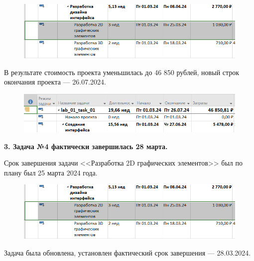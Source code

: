 \begin{figure}[h!]
	\begin{center}
		\includegraphics[scale=0.5]{inc/img/p_10.png}
	\end{center}
	\captionsetup{justification=centering}
	\label{fig:u3}
\end{figure}

В результате стоимость проекта уменьшилась до 46 850 рублей, новый строк окончания проекта --- 26.07.2024. 

\begin{figure}[h!]
	\begin{center}
		\includegraphics[scale=0.5]{inc/img/p_9.png}
	\end{center}
	\captionsetup{justification=centering}
	\label{fig:u3}
\end{figure}

\textbf{3. Задача №4 фактически завершилась 28 марта.}

Срок завершения задачи <<Разработка 2D графических элементов>> был по плану был 25 марта 2024 года.

\begin{figure}[h!]
	\begin{center}
		\includegraphics[scale=0.5]{inc/img/p_11.png}
	\end{center}
	\captionsetup{justification=centering}
	\label{fig:u3}
\end{figure}

Задача была обновлена, установлен фактический срок завершения --- 28.03.2024.


